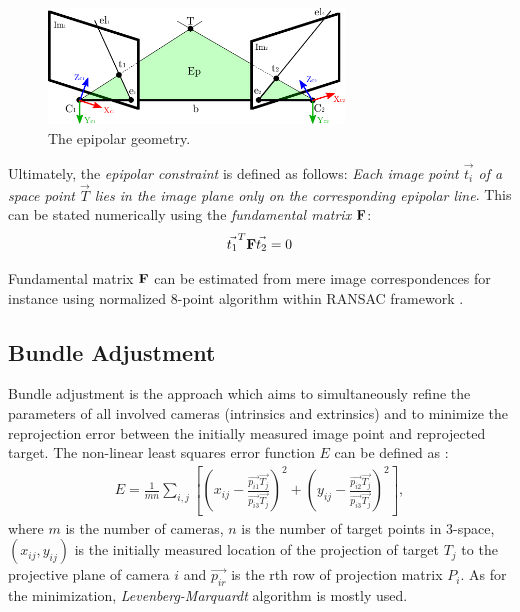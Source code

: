 \begin{figure}[tbh]
	\centering
	\includegraphics[width=0.7\textwidth]{fig/epipolar_geometry.pdf}
	\caption{The epipolar geometry.}
	\label{fig:epipolar_geometry}
\end{figure}

Ultimately, the \textit{epipolar constraint} is defined as follows: \textit{Each image point $\vec{t_{i}}$ of a space point $\vec{T}$ lies in the image plane only on the corresponding epipolar line}. This can be stated numerically using the \textit{fundamental matrix} $\mathbf{F}$:
\begin{align}
	\vec{t_{1}}^{T}\mathbf{F}\vec{t_{2}} = 0
\end{align}

Fundamental matrix $\mathbf{F}$ can be estimated from mere image correspondences for instance using normalized 8-point algorithm within RANSAC framework \cite{Hartley:2003:MVG:861369, Cyganek:2007:ICV:1214366}.

\subsection{Bundle Adjustment} \label{txt:bundle_adjustment}

Bundle adjustment is the approach which aims to simultaneously refine the parameters of all involved cameras (intrinsics and extrinsics) and to minimize the reprojection error between the initially measured image point and reprojected target. The non-linear least squares error function $E$ can be defined as \cite{Forsyth:2002:CVM:580035}:
\begin{align}
	E = \frac{1}{mn}\sum_{i,j}{ \left[ (x_{ij} - \frac{\vec{p_{i1}}\vec{T_{j}}}{\vec{p_{i3}}\vec{T_{j}}})^{2} + (y_{ij} - \frac{\vec{p_{i2}}\vec{T_{j}}}{\vec{p_{i3}}\vec{T_{j}}})^{2} \right] },
\end{align}
where $m$ is the number of cameras, $n$ is the number of target points in 3-space, $(x_{ij}, y_{ij})$ is the initially measured location of the projection of target $T_{j}$ to the projective plane of camera $i$ and $\vec{p_{ir}}$ is the rth row of projection matrix $P_{i}$. As for the minimization, \textit{Levenberg-Marquardt} algorithm \cite{marquardt:1963} is mostly used. 

